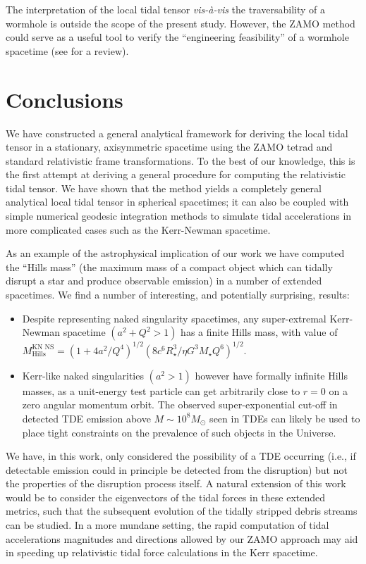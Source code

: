 \documentclass[
    reprint,
    prd,
    nofootinbib,
    amsmath,amssymb,
    aps,
    floatfix,
]{revtex4-2}
\begin{document}
The interpretation of the local tidal tensor \textit{vis-à-vis} the traversability of a wormhole is outside the scope of the present study. However, the ZAMO method could serve as a useful tool to verify the ``engineering feasibility'' of a wormhole spacetime (see \cite{Lobo2007} for a review).


\section{Conclusions} \label{sec:conclusion}


We have constructed a general analytical framework for deriving the local tidal tensor in a stationary, axisymmetric spacetime using the ZAMO tetrad and standard relativistic frame transformations. To the best of our knowledge, this is the first attempt at deriving a general procedure for computing the relativistic tidal tensor. We have shown that the method yields a completely general analytical local tidal tensor in spherical spacetimes; it can also be coupled with simple numerical geodesic integration methods to simulate tidal accelerations in more complicated cases such as the Kerr-Newman spacetime.

As an example of the astrophysical implication of our work we have computed the ``Hills mass'' (the maximum mass of a compact object which can tidally disrupt a star and produce observable emission) in a number of extended spacetimes. We find a number of interesting, and potentially surprising, results: 

\begin{itemize}
    \item Despite representing naked singularity spacetimes, any super-extremal Kerr-Newman spacetime $(a^2 + Q^2 > 1)$ has a finite Hills mass, with value of $M_{\text{Hills}}^{\text{KN NS}} = (1+4a^{2}/Q^{4})^{1/2} (8c^{6} R_{\star}^{3}/\eta G^{3}M_{\star}Q^{6})^{1/2}$.
    \item Kerr-like naked singularities $(a^2>1)$ however have formally infinite Hills masses, as a unit-energy test particle can get arbitrarily close to $r=0$ on a zero angular momentum orbit. The observed super-exponential cut-off in detected TDE emission above $M \sim 10^8 M_\odot$ seen in TDEs \cite{Yao23, MummeryVV25} can likely be used to place tight constraints on the prevalence of such objects in the Universe. 
\end{itemize}

We have, in this work, only considered the possibility of a TDE occurring (i.e., if detectable emission could in principle be detected from the disruption) but not the properties of the disruption process itself. A natural extension of this work would be to consider the eigenvectors of the tidal forces in these extended metrics, such that the subsequent evolution of the tidally stripped debris streams can be studied. In a more mundane setting, the rapid computation of tidal accelerations magnitudes and directions allowed by our ZAMO approach may aid in speeding up relativistic tidal force calculations in the Kerr spacetime. 
\end{document}
